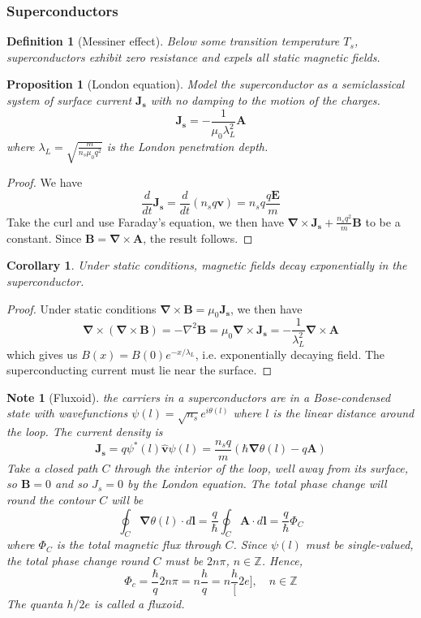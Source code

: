 \documentclass[a4paper]{article}
\newtheorem{Note}{Note}[section]
\theoremstyle{new}
\newtheorem{defi}{Definition}[section]
\newtheorem{prop}{Proposition}[section]
\newtheorem{cor}{Corollary}[section]
\begin{document}
\subsubsection{Superconductors}
\begin{defi}[Messiner effect]
Below some transition temperature $T_s$, superconductors exhibit zero resistance and expels all static magnetic fields.
\end{defi}
\begin{prop}[London equation]
Model the superconductor as a semiclassical system of surface current $\mathbf{J_s}$ with no damping to the motion of the charges.
$$\mathbf{J_s}=-\frac{1}{\mu_0\lambda_L^2}\mathbf{A}$$
where $\lambda_L=\sqrt{\frac{m}{n_s\mu_0q^2}}$ is the London penetration depth.
\end{prop}
\begin{proof}
We have
$$\frac{d}{dt}\mathbf{J_s}=\frac{d}{dt}(n_sq\mathbf{v})=n_sq\frac{q\mathbf{E}}{m}$$
Take the curl and use Faraday's equation, we then have $\boldsymbol{\nabla}\times\mathbf{J_s}+\frac{n_sq^2}{m}\mathbf{B}$ to be a constant. Since $\mathbf{B}=\boldsymbol{\nabla}\times\mathbf{A}$, the result follows.
\end{proof}
\begin{cor}
Under static conditions, magnetic fields decay exponentially in the superconductor.
\end{cor}
\begin{proof}
Under static conditions $\boldsymbol{\nabla}\times\mathbf{B}=\mu_0\mathbf{J_s}$, we then have
$$\boldsymbol{\nabla}\times(\boldsymbol{\nabla}\times\mathbf{B})=-\nabla^2\mathbf{B}=\mu_0\boldsymbol{\nabla}\times\mathbf{J_s}=-\frac{1}{\lambda_L^2}\boldsymbol{\nabla}\times\mathbf{A}$$
which gives us $B(x)=B(0)e^{-x/\lambda_L}$, i.e. exponentially decaying field. The superconducting current must lie near the surface.
\end{proof}
\begin{Note}[Fluxoid]
the carriers in a superconductors are in a Bose-condensed state with wavefunctions $\psi(l)=\sqrt{n_s}e^{i\theta(l)}$ where $l$ is the linear distance around the loop. The current density is
$$\mathbf{J_s}=q\psi^*(l)\mathbf{\hat{v}}\psi(l)=\frac{n_sq}{m}(\hbar\boldsymbol{\nabla}\theta(l)-q\mathbf{A})$$
Take a closed path $C$ through the interior of the loop, well away from its surface, so $\mathbf{B}=0$ and so $J_s=0$ by the London equation. The total phase change will round the contour $C$ will be
$$\oint_C\boldsymbol{\nabla}\theta(l)\cdot d\mathbf{l}=\frac{q}{\hbar}\oint_C\mathbf{A}\cdot d\mathbf{l}=\frac{q}{\hbar}\Phi_C$$
where $\Phi_C$ is the total magnetic flux through $C$. Since $\psi(l)$ must be single-valued, the total phase change round $C$ must be $2n\pi$, $n\in\mathbb{Z}$. Hence,
$$\Phi_c=\frac{\hbar}{q}2n\pi=n\frac{h}{q}=n\frac{h}[2e],\quad n\in\mathbb{Z}$$
The quanta $h/2e$ is called a fluxoid.
\end{Note}
\end{document}

